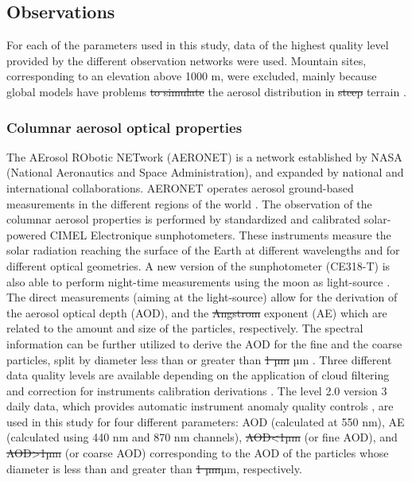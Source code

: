 \documentclass[acp, manuscript]{copernicus}
\providecommand{\DIFadd}[1]{{\protect\color{blue}\uwave{#1}}} %
\providecommand{\DIFdel}[1]{{\protect\color{red}\sout{#1}}}                      %
\providecommand{\DIFaddbegin}{} %
\providecommand{\DIFaddend}{} %
\providecommand{\DIFdelbegin}{} %
\providecommand{\DIFdelend}{} %
\begin{document}
\subsection{Observations}

For each of the parameters used in this study, data of the highest quality level provided by the different observation networks were used. Mountain sites, corresponding to an elevation above 1000 m, were excluded, mainly because global models have problems \DIFdelbegin \DIFdel{to simulate }\DIFdelend \DIFaddbegin \DIFadd{simulating }\DIFaddend the aerosol distribution in \DIFdelbegin \DIFdel{steep }\DIFdelend \DIFaddbegin \DIFadd{complex }\DIFaddend terrain \citep{kinne2013mac}.

\subsubsection{Columnar aerosol optical properties}

The AErosol RObotic NETwork (AERONET) is a network established by NASA (National Aeronautics and Space Administration), and expanded by national and international collaborations. AERONET operates aerosol ground-based measurements in the different regions of the world \citep{holben2001emerging}. The observation of the columnar aerosol properties is performed by standardized and calibrated solar-powered CIMEL Electronique sunphotometers. These instruments measure the solar radiation reaching the surface of the Earth at different wavelengths and for different optical geometries. A new version of the sunphotometer (CE318-T) is also able to perform night-time measurements using the moon as light-source \citep{barreto2016new}. The direct measurements (aiming at the light-source) allow for the derivation of the aerosol optical depth (AOD), and the \DIFdelbegin \DIFdel{Angstrom }\DIFdelend \DIFaddbegin \DIFadd{Ångström }\DIFaddend exponent (AE) which are related to the amount and size of the particles, respectively. The spectral information can be further utilized to derive the AOD for the fine and the coarse particles, split by diameter less than or greater than \DIFdelbegin \DIFdel{1 µm }\DIFdelend \DIFaddbegin \DIFadd{1.2 }\unit{µm} \DIFaddend \citep{o2003spectral}. Three different data quality levels are available depending on the application of cloud filtering and correction for instruments calibration derivations \citep{smirnov2000cloud,smirnov2004aeronet}. The level 2.0 version 3 daily data, which provides automatic instrument anomaly quality controls \citep{giles2019advancements}, are used in this study for four different parameters:
AOD (calculated at 550 nm), AE (calculated using 440 nm and 870 nm channels), \DIFdelbegin \DIFdel{AOD<1µm }\DIFdelend \DIFaddbegin {} \DIFaddend (or fine AOD), and \DIFdelbegin \DIFdel{AOD>1µm }\DIFdelend \DIFaddbegin {} \DIFaddend (or coarse AOD) corresponding to the AOD of the particles whose diameter is less than and greater than \DIFdelbegin \DIFdel{1 µm}\DIFdelend \DIFaddbegin \DIFadd{1.2 }\unit{µm}\DIFaddend , respectively.
\end{document}
